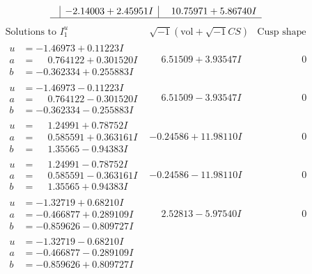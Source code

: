 \documentclass[1p]{elsarticle_modified}
\theoremstyle{definition}
\newcommand{\I}{\sqrt{-1}}
\begin{document}
$$\begin{array}{c|c|c}
 & -2.14003 + 2.45951 I & \phantom{-}10.75971 + 5.86740 I\\
 \hline 
 \end{array}$$\newpage$$\begin{array}{c|c|c}  
\text{Solutions to }I^u_{1}& \I (\text{vol} + \sqrt{-1}CS) & \text{Cusp shape}\\
 \hline 
\begin{aligned}
u &= -1.46973 + 0.11223 I \\
a &= \phantom{-}0.764122 + 0.301520 I \\
b &= -0.362334 + 0.255883 I\end{aligned}
 & \phantom{-}6.51509 + 3.93547 I & \phantom{-0.000000 } 0 \\ \hline\begin{aligned}
u &= -1.46973 - 0.11223 I \\
a &= \phantom{-}0.764122 - 0.301520 I \\
b &= -0.362334 - 0.255883 I\end{aligned}
 & \phantom{-}6.51509 - 3.93547 I & \phantom{-0.000000 } 0 \\ \hline\begin{aligned}
u &= \phantom{-}1.24991 + 0.78752 I \\
a &= \phantom{-}0.585591 + 0.363161 I \\
b &= \phantom{-}1.35565 - 0.94383 I\end{aligned}
 & -0.24586 + 11.98110 I & \phantom{-0.000000 } 0 \\ \hline\begin{aligned}
u &= \phantom{-}1.24991 - 0.78752 I \\
a &= \phantom{-}0.585591 - 0.363161 I \\
b &= \phantom{-}1.35565 + 0.94383 I\end{aligned}
 & -0.24586 - 11.98110 I & \phantom{-0.000000 } 0 \\ \hline\begin{aligned}
u &= -1.32719 + 0.68210 I \\
a &= -0.466877 + 0.289109 I \\
b &= -0.859626 - 0.809727 I\end{aligned}
 & \phantom{-}2.52813 - 5.97540 I & \phantom{-0.000000 } 0 \\ \hline\begin{aligned}
u &= -1.32719 - 0.68210 I \\
a &= -0.466877 - 0.289109 I \\
b &= -0.859626 + 0.809727 I\end{aligned}

\end{array}$$
\end{document}

